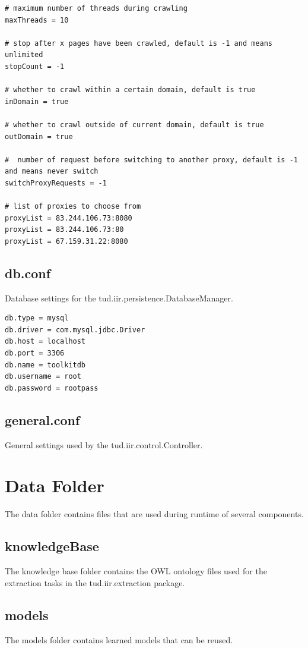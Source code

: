 \documentclass[a4paper,twoside]{book}      %
\begin{document}
\begin{verbatim}
# maximum number of threads during crawling
maxThreads = 10

# stop after x pages have been crawled, default is -1 and means unlimited
stopCount = -1

# whether to crawl within a certain domain, default is true
inDomain = true
	
# whether to crawl outside of current domain, default is true
outDomain = true

#  number of request before switching to another proxy, default is -1 and means never switch
switchProxyRequests = -1
	
# list of proxies to choose from
proxyList = 83.244.106.73:8080
proxyList = 83.244.106.73:80
proxyList = 67.159.31.22:8080
\end{verbatim}

\subsection{db.conf}
Database settings for the tud.iir.persistence.DatabaseManager.

\begin{verbatim}
db.type = mysql
db.driver = com.mysql.jdbc.Driver
db.host = localhost
db.port = 3306
db.name = toolkitdb
db.username = root
db.password = rootpass
\end{verbatim}

\subsection{general.conf}
General settings used by the tud.iir.control.Controller.

\section{Data Folder}
The data folder contains files that are used during runtime of several components.

\subsection{knowledgeBase} 
The knowledge base folder contains the OWL ontology files used for the extraction tasks in the tud.iir.extraction package.

\subsection{models}
The models folder contains learned models that can be reused.
\end{document}
